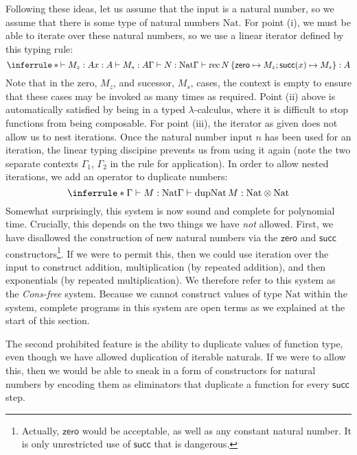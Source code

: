 \documentclass[acmsmall,screen]{acmart}
\newcommand{\tmRec}{\mathrm{rec}}
\newcommand{\tyNat}{\mathrm{Nat}}
\newcommand{\conZero}{\mathsf{zero}}
\newcommand{\conSucc}{\mathsf{succ}}
\newcommand{\dupNat}{\mathrm{dupNat}}
\newcommand{\ConsFree}{\emph{Cons-free}}
\begin{document}
Following these ideas, let us assume that the input is a natural
number, so we assume that there is some type of natural numbers
$\tyNat$. For point (i), we must be able to iterate over these natural
numbers, so we use a linear iterator defined by this typing rule:
\begin{displaymath}
  \inferrule*
  {\vdash M_z : A \\ x : A \vdash M_s : A \\ \Gamma \vdash N : \tyNat}
  {\Gamma \vdash \tmRec\,N\,\{\conZero \mapsto M_z; \conSucc(x) \mapsto M_s\} : A}
\end{displaymath}
Note that in the zero, $M_z$, and sucessor, $M_s$, cases, the context
is empty to ensure that these cases may be invoked as many times as
required. Point (ii) above is automatically satisfied by being in a
typed $\lambda$-calculus, where it is difficult to stop functions from
being composable. For point (iii), the iterator as given does not
allow us to nest iterations. Once the natural number input $n$ has
been used for an iteration, the linear typing discipine prevents us
from using it again (note the two separate contexts $\Gamma_1$,
$\Gamma_2$ in the rule for application). In order to allow nested
iterations, we add an operator to duplicate numbers:
\begin{displaymath}
  \inferrule*
  {\Gamma \vdash M : \tyNat}
  {\Gamma \vdash \dupNat\,M : \tyNat \otimes \tyNat}
\end{displaymath}
Somewhat surprisingly, this system is now sound and complete for
polynomial time. Crucially, this depends on the two things we have
\emph{not} allowed. First, we have disallowed the construction of new
natural numbers via the $\conZero$ and $\conSucc$
constructors\footnote{Actually, $\conZero$ would be acceptable, as
  well as any constant natural number. It is only unrestricted use of
  $\conSucc$ that is dangerous.}. If we were to permit this, then we
could use iteration over the input to construct addition,
multiplication (by repeated addition), and then exponentials (by
repeated multiplication). We therefore refer to this system as the
\ConsFree{} system.  Because we cannot construct values of type
$\tyNat$ within the system, complete programs in this system are open
terms as we explained at the start of this section.

The second prohibited feature is the ability to duplicate values of
function type, even though we have allowed duplication of iterable
naturals. If we were to allow this, then we would be able to sneak in
a form of constructors for natural numbers by encoding them as
eliminators that duplicate a function for every $\conSucc$ step.
\end{document}
